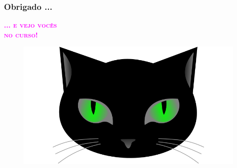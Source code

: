 \begin{frame}[fragile]
  \frametitle{Obrigado ...}

\begin{minipage}{0.47\textwidth}
\begin{huge}
\begin{center}
\textbf{\textcolor{magenta}{\textsc{... e vejo vocês\\ no curso!}}}
\end{center}
\end{huge}
\end{minipage}
\begin{minipage}{0.5\textwidth}
\begin{figure}[ht!]
\begin{center}
\includegraphics[width=1.2\textwidth, height=0.40\textheight]{figures/logo_picat_alex.jpg}
\end{center}
\end{figure}
\end{minipage}



\end{frame}
						

